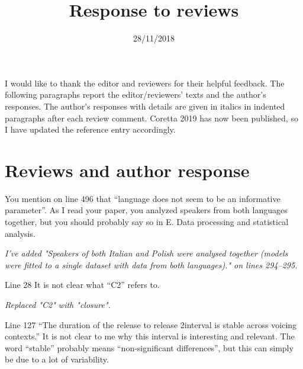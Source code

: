 \documentclass[]{article}
\title{Response to reviews}
\date{28/11/2018}
\begin{document}
\maketitle

I would like to thank the editor and reviewers for their helpful
feedback. The following paragraphs report the editor/reviewers' texts
and the author's responses. The author's responses with details are
given in italics in indented paragraphs after each review comment.
Coretta 2019 has now been published, so I have updated the reference
entry accordingly.

\hypertarget{reviews-and-author-response}{%
\section{Reviews and author
response}\label{reviews-and-author-response}}

You mention on line 496 that ``language does not seem to be an
informative parameter''. As I read your paper, you analyzed speakers
from both languages together, but you should probably say so in E. Data
processing and statistical analysis.

\begin{adjustwidth}{1cm}{} \textit{
I've added "Speakers of both Italian and Polish were analysed together (models were fitted to a single dataset with data from both languages)." on lines 294--295.
} \end{adjustwidth}

Line 28 It is not clear what ``C2'' refers to.

\begin{adjustwidth}{1cm}{} \textit{
Replaced "C2" with "closure".
} \end{adjustwidth}

Line 127 ``The duration of the release to release 2interval is stable
across voicing contexts.'' It is not clear to me why this interval is
interesting and relevant. The word ``stable'' probably means
``non-significant differences'', but this can simply be due to a lot of
variability.
\end{document}
